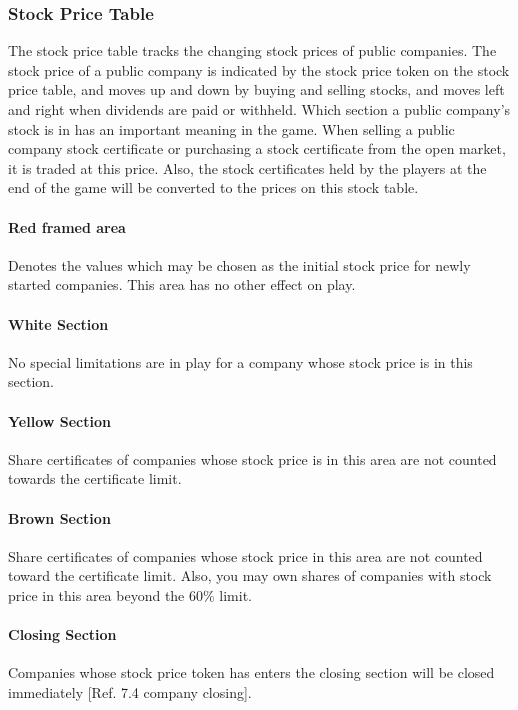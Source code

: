 \documentclass{article}
\begin{document}
\begin{CJK}{UTF8}{min}
\begin{multicols}{2}
\subsubsection{Stock Price Table}
The stock price table tracks the changing stock prices of public
companies. The stock price of a public company is indicated by the
stock price token on the stock price table, and moves up and down by
buying and selling stocks, and moves left and right when dividends are
paid or withheld. Which section a public company's stock is in has an
important meaning in the game. When selling a public company stock
certificate or purchasing a stock certificate from the open market, it
is traded at this price. Also, the stock certificates held by the
players at the end of the game will be converted to the prices on this
stock table.


\paragraph{Red framed area}
Denotes the values which may be chosen as the initial stock price for
newly started companies. This area has no other effect on play.


\paragraph{White Section}
No special limitations are in play for a company whose stock price is
in this section.


\paragraph{Yellow Section}
Share certificates of companies whose stock price is in this area
are not counted towards the certificate limit.


\paragraph{Brown Section}
Share certificates of companies whose stock price in this area
are not counted toward the certificate limit. Also, you
may own shares of companies with stock price in this area beyond the
60\% limit.


\paragraph{Closing Section}
Companies whose stock price token has enters the closing
section will be closed immediately [Ref. 7.4 company closing].



\end{multicols}
\end{CJK}
\end{document}
